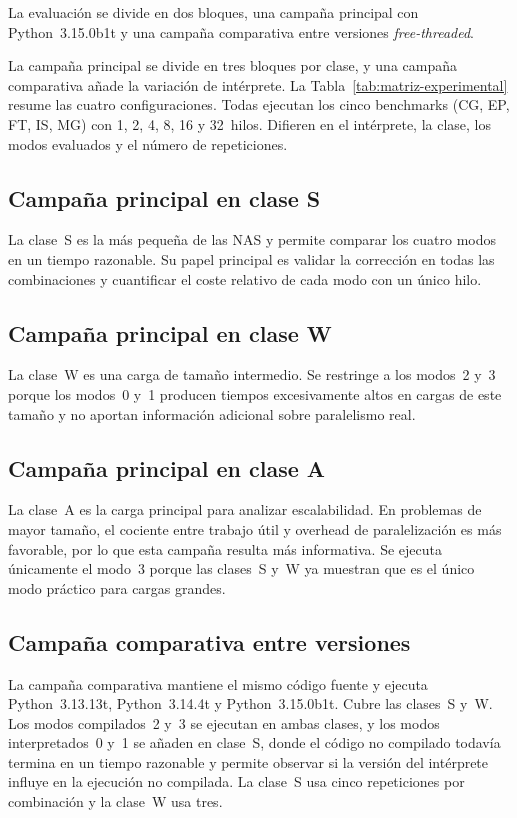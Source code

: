 La evaluación se divide en dos bloques, una campaña principal con
Python~3.15.0b1t y una campaña comparativa entre versiones \emph{free-threaded}.

La campaña principal se divide en tres bloques por clase, y una campaña
comparativa añade la variación de intérprete. La
Tabla~\ref{tab:matriz-experimental} resume las cuatro configuraciones. Todas
ejecutan los cinco benchmarks (CG, EP, FT, IS, MG) con 1, 2, 4, 8, 16 y
32~hilos. Difieren en el intérprete, la clase, los modos evaluados y el número
de repeticiones.

\subsection{Campaña principal en clase S}
La clase~S es la más pequeña de las NAS y permite comparar los cuatro modos en
un tiempo razonable. Su papel principal es validar la corrección en todas las
combinaciones y cuantificar el coste relativo de cada modo con un único hilo.

\subsection{Campaña principal en clase W}
La clase~W es una carga de tamaño intermedio. Se restringe a los
modos~2 y~3 porque los modos~0 y~1 producen tiempos excesivamente altos en
cargas de este tamaño y no aportan información adicional sobre paralelismo real.

\subsection{Campaña principal en clase A}
La clase~A es la carga principal para analizar escalabilidad. En problemas de
mayor tamaño, el cociente entre trabajo útil y overhead de paralelización es más
favorable, por lo que esta campaña resulta más informativa. Se ejecuta
únicamente el modo~3 porque las clases~S y~W ya muestran que es el único modo
práctico para cargas grandes.

\subsection{Campaña comparativa entre versiones}
La campaña comparativa mantiene el mismo código fuente y ejecuta Python~3.13.13t,
Python~3.14.4t y Python~3.15.0b1t. Cubre las clases~S y~W. Los modos
compilados~2 y~3 se ejecutan en ambas clases, y los modos interpretados~0 y~1 se
añaden en clase~S, donde el código no compilado todavía termina en un tiempo
razonable y permite observar si la versión del intérprete influye en la
ejecución no compilada. La clase~S usa cinco repeticiones por combinación y la
clase~W usa tres.

